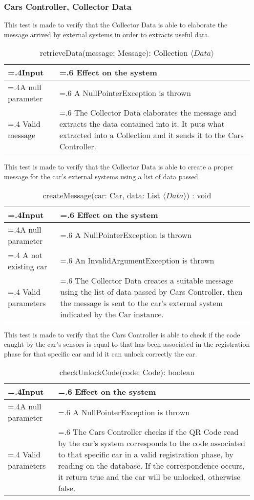 \documentclass[10pt, a4paper,titlepage]{article}
\begin{document}
\subsubsection{Cars Controller, Collector Data}
This test is made to verify that the Collector Data is able to elaborate the message arrived by external systems in order to extracts useful data.
\begin{table}[h]
\caption{retrieveData(message: Message): Collection $\langle Data \rangle$}
\begin{tabularx}{\textwidth}{|>{\hsize=.4\hsize}X|>{\hsize=.6\hsize}X|}
\hline
Input & Effect on the system\\
\hline
A null parameter & A NullPointerException is thrown\\
\hline
Valid message & The Collector Data elaborates the message and extracts the data contained into it. It puts what extracted into a Collection and it sends it to the Cars Controller.\\
\hline
\end{tabularx}
\end{table}
\linebreak
This test is made to verify that the Collector Data is able to create a proper message for the car’s external systems using a list of data passed.
\begin{table}[h]
\caption{createMessage(car: Car, data: List $\langle Data \rangle$) : void}
\begin{tabularx}{\textwidth}{|>{\hsize=.4\hsize}X|>{\hsize=.6\hsize}X|}
\hline
Input & Effect on the system\\
\hline
A null parameter & A NullPointerException is thrown\\
\hline
A not existing car & An InvalidArgumentException is thrown\\
\hline
Valid parameters & The Collector Data creates a suitable message using the list of data passed by Cars Controller, then the message is sent to the car’s external system indicated by the Car instance.\\
\hline
\end{tabularx}
\end{table}
\linebreak
This test is made to verify that the Cars Controller is able to check if the code caught by the car’s sensors is equal to that has been associated in the registration phase for that specific car and id it can unlock correctly the car.
\begin{table}[h]
\caption{checkUnlockCode(code: Code): boolean}
\begin{tabularx}{\textwidth}{|>{\hsize=.4\hsize}X|>{\hsize=.6\hsize}X|}
\hline
Input & Effect on the system\\
\hline
A null parameter & A NullPointerException is thrown\\
\hline
Valid parameters & The Cars Controller checks if the QR Code read by the car’s system corresponds to the code associated to that specific car in a valid registration phase, by reading on the database. If the correspondence occurs, it return true and the car will be unlocked, otherwise false.\\
\hline
\end{tabularx}
\end{table}
\pagebreak
\end{document}
